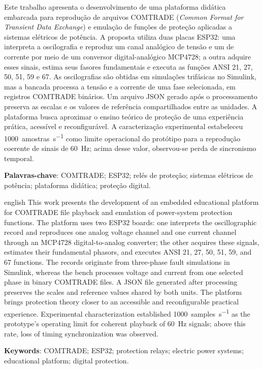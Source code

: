 \documentclass[
  12pt,
  oneside,
  a4paper,
  brazil,
  sumario=tradicional
]{abntex2}
\begin{document}
\begin{resumo}
Este trabalho apresenta o desenvolvimento de uma plataforma didática embarcada para reprodução de arquivos COMTRADE (\textit{Common Format for Transient Data Exchange}) e emulação de funções de proteção aplicadas a sistemas elétricos de potência. A proposta utiliza duas placas ESP32: uma interpreta a oscilografia e reproduz um canal analógico de tensão e um de corrente por meio de um conversor digital-analógico MCP4728; a outra adquire esses sinais, estima seus fasores fundamentais e executa as funções ANSI 21, 27, 50, 51, 59 e 67. As oscilografias são obtidas em simulações trifásicas no Simulink, mas a bancada processa a tensão e a corrente de uma fase selecionada, em registros COMTRADE binários. Um arquivo JSON gerado após o processamento preserva as escalas e os valores de referência compartilhados entre as unidades. A plataforma busca aproximar o ensino teórico de proteção de uma experiência prática, acessível e reconfigurável. A caracterização experimental estabeleceu \SI{1000}{amostras\per\second} como limite operacional do protótipo para a reprodução coerente de sinais de \SI{60}{\hertz}; acima desse valor, observou-se perda de sincronismo temporal.

\vspace{\onelineskip}

\noindent
\textbf{Palavras-chave}: COMTRADE; ESP32; relés de proteção; sistemas elétricos de potência; plataforma didática; proteção digital.
\end{resumo}

\begin{resumo}[Abstract]
\begin{otherlanguage*}{english}
This work presents the development of an embedded educational platform for COMTRADE file playback and emulation of power-system protection functions. The platform uses two ESP32 boards: one interprets the oscillographic record and reproduces one analog voltage channel and one current channel through an MCP4728 digital-to-analog converter; the other acquires these signals, estimates their fundamental phasors, and executes ANSI 21, 27, 50, 51, 59, and 67 functions. The records originate from three-phase fault simulations in Simulink, whereas the bench processes voltage and current from one selected phase in binary COMTRADE files. A JSON file generated after processing preserves the scales and reference values shared by both units. The platform brings protection theory closer to an accessible and reconfigurable practical experience. Experimental characterization established \SI{1000}{samples\per\second} as the prototype's operating limit for coherent playback of \SI{60}{\hertz} signals; above this rate, loss of timing synchronization was observed.

\vspace{\onelineskip}

\noindent
\textbf{Keywords}: COMTRADE; ESP32; protection relays; electric power systems; educational platform; digital protection.
\end{otherlanguage*}
\end{resumo}
\end{document}
